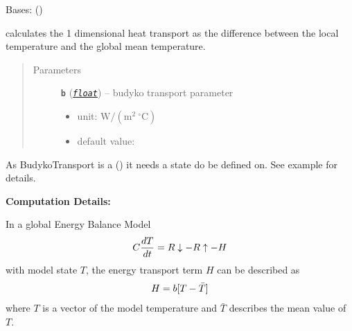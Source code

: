 \documentclass[a4paper,10pt,english]{sphinxmanual}
\begin{document}
\begin{fulllineitems}
\label{api/climlab.dynamics:climlab.dynamics.budyko_transport.BudykoTransport}
Bases: {\hyperref[api/climlab.process:climlab.process.energy_budget.EnergyBudget]{\emph{}}} ()

calculates the 1 dimensional heat transport as the difference 
between the local temperature and the global mean temperature.
\begin{quote}\begin{description}
\item[{Parameters}] \leavevmode
\textbf{\texttt{b}} (\href{http://docs.python.org/2.7/library/functions.html\#float}{\emph{\texttt{float}}}) -- 
budyko transport parameter
\begin{itemize}
\item {} 
unit: \(\textrm{W} / \left( \textrm{m}^2 \ ^{\circ} \textrm{C} \right)\)

\item {} 
default value: 

\end{itemize}


\end{description}\end{quote}

As BudykoTransport is a {\hyperref[api/climlab.process:climlab.process.process.Process]{\emph{}}} () it needs
a state do be defined on. See example for details.

\textbf{Computation Details:}

In a global Energy Balance Model
\begin{gather}
\begin{split}C \frac{dT}{dt} = R\downarrow - R\uparrow - H\end{split}\notag
\end{gather}
with model state \(T\), the energy transport term \(H\) 
can be described as
\begin{gather}
\begin{split}H = b [T - \bar{T}]\end{split}\notag
\end{gather}
where \(T\) is a vector of the model temperature and \(\bar{T}\)
describes the mean value of \(T\).


\end{fulllineitems}
\end{document}
